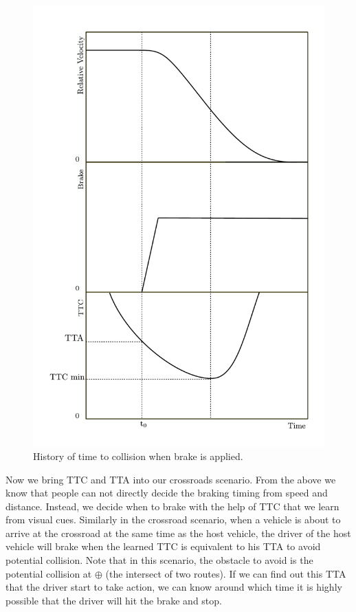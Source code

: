 \documentclass[twocolumn,10pt]{asme2e}
\begin{document}
\begin{figure}[htbp!]
\begin{center}
\includegraphics[scale=0.4]{TTC_change_when_braking.pdf}
\end{center}
\caption{History of time to collision when brake is applied.}
\label{TTC_history} 
\end{figure}


Now we bring TTC and TTA into our crossroads scenario. From the above we know that people can not directly decide the braking timing from speed and distance. Instead, we decide when to brake with the help of TTC that we learn from visual cues. Similarly in the crossroad scenario, when a vehicle is about to arrive at the crossroad at the same time as the host vehicle, the driver of the host vehicle will brake when the learned TTC is equivalent to his TTA to avoid potential collision. Note that in this scenario, the obstacle to avoid is the potential collision at $\oplus$ (the intersect of two routes). If we can find out this TTA that the driver start to take action, we can know around which time it is highly possible that the driver will hit the brake and stop.
\end{document}
